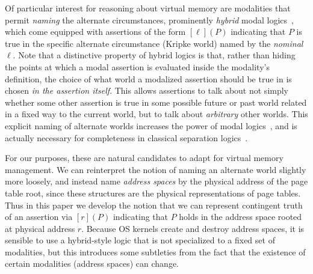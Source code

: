 
Of particular interest for reasoning about virtual memory are modalities that permit \emph{naming} the alternate 
circumstances, prominently \emph{hybrid} modal logics~\cite{blackburn1995hybrid,areces2001hybrid}, which come equipped 
with assertions of the form $[\ell](P)$ indicating that $P$ is true in the specific alternate circumstance (Kripke world)
 named by the \emph{nominal} $\ell$. Note that a distinctive property of hybrid logics is that, rather than hiding
the points at which a modal assertion is evaluated inside the modality's definition, the choice of what world a modalized
assertion should be true in is chosen \emph{in the assertion itself}. This allows assertions to talk about not simply whether some other assertion
is true in some possible future or past world related in a fixed way to the current world, but to talk about \emph{arbitrary}
other worlds. This explicit naming of alternate worlds increases the power of modal logics~\cite{blackburn1995hybrid}, and is actually
necessary for completeness in classical separation logics~\cite{brotherston2014parametric}.

For our purposes, these are natural candidates to adapt for virtual memory management. We can reinterpret the notion of 
naming an alternate world slightly more loosely, and instead name \emph{address spaces} by the physical address of the 
page table root, since these structures are the physical representations of page tables. Thus in this paper we develop 
the notion that we can represent contingent truth of an assertion via $[r](P)$ indicating that $P$ holds in the address 
space rooted at physical address $r$. Because OS kernels create and destroy address spaces, it is sensible to use
a hybrid-style logic that is not specialized to a fixed set of modalities, but this introduces
some subtleties from the fact that the existence of certain modalities (address spaces) can change.

